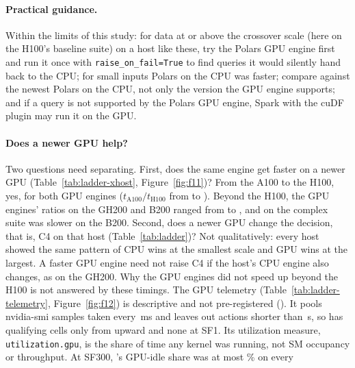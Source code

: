 \documentclass[11pt]{article}
\begin{document}
\paragraph{Practical guidance.} Within the limits of this study: for data at or
above the crossover scale (here  on the
H100's baseline suite) on a host like these, try the Polars GPU engine first
and run it once with \texttt{raise\_on\_fail=True} to find queries it would
silently hand back to the CPU; for small inputs Polars on the CPU was faster;
compare against the newest Polars on the CPU, not only the version the GPU
engine supports; and if a query is not supported by the Polars GPU engine,
Spark with the cuDF plugin may run it on the GPU.

\ifladderran
\paragraph{Does a newer GPU help?} Two questions need separating. First, does
the same engine get faster on a newer GPU (Table~\ref{tab:ladder-xhost},
Figure~\ref{fig:f11})? From the A100 to the H100, yes, for both GPU engines
($t_{\mathrm{A100}}/t_{\mathrm{H100}}$ from  to
). Beyond the H100, the GPU engines' ratios on
the GH200 and B200 ranged from  to
, and \polarsgpu{} on the complex suite was
slower on the B200. Second, does a newer GPU change the decision, that is, C4
on that host (Table~\ref{tab:ladder})? Not qualitatively: every host showed the
same pattern of CPU wins at the smallest scale and GPU wins at the largest. A
faster GPU engine need not raise C4 if the host's CPU engine also changes, as
on the GH200. Why the GPU engines did not speed up beyond the H100 is not
answered by these timings. The GPU telemetry
(Table~\ref{tab:ladder-telemetry}, Figure~\ref{fig:f12}) is descriptive and not
pre-registered (). It pools nvidia-smi
samples taken every \,ms and
leaves out actions shorter than \,s,
so \polarsgpu{} has qualifying cells only from
 upward and none at SF1. Its
utilization measure, \texttt{utilization.gpu}, is the share of time any kernel
was running, not SM occupancy or throughput. At SF300, \polarsgpu{}'s GPU-idle
share was at most \% on every
\end{document}
